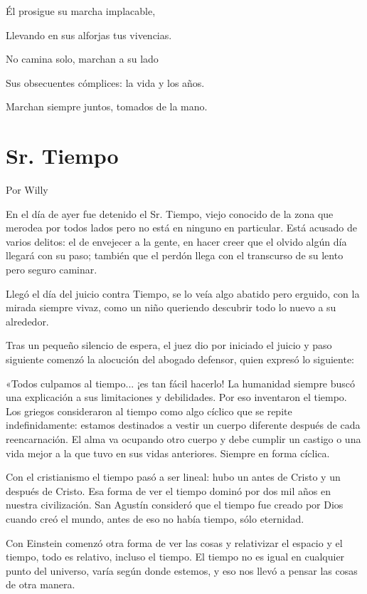 \documentclass[11pt,twoside,openright,a5paper]{book}
\begin{document}
Él prosigue su marcha implacable,

Llevando en sus alforjas tus vivencias.

No camina solo, marchan a su lado

Sus obsecuentes cómplices: la vida y los años.

Marchan siempre juntos, tomados de la mano.

\section*{Sr. Tiempo}

                                                                                           \begin{flushright}Por Willy\end{flushright}

En el día de ayer fue detenido el Sr. Tiempo, viejo conocido de la zona que merodea por todos lados pero no está en ninguno en particular. Está acusado de varios delitos: el de envejecer a la gente, en hacer creer que el olvido algún día llegará con su paso; también que el perdón llega con el transcurso de su lento pero seguro caminar.

Llegó el día del juicio contra Tiempo, se lo veía algo abatido pero erguido, con la mirada siempre vivaz, como un niño queriendo descubrir todo lo nuevo a su alrededor. 

Tras un pequeño silencio de espera, el juez dio por iniciado el juicio y paso siguiente comenzó la alocución del abogado defensor, quien expresó lo siguiente: 

«Todos culpamos al tiempo... ¡es tan fácil hacerlo! La humanidad siempre buscó una explicación a sus limitaciones y debilidades. Por eso inventaron el tiempo. Los griegos consideraron al tiempo como algo cíclico que se repite indefinidamente: estamos destinados a vestir un cuerpo diferente después de cada reencarnación. El alma va ocupando otro cuerpo y debe cumplir un castigo o una vida mejor a la que tuvo en sus vidas anteriores. Siempre en forma cíclica.

Con el cristianismo el tiempo pasó a ser lineal: hubo un antes de Cristo y un después de Cristo. Esa forma de ver el tiempo dominó por dos mil años en nuestra civilización. San Agustín consideró que el tiempo fue creado por Dios cuando creó el mundo, antes de eso no había tiempo, sólo eternidad.

Con Einstein comenzó otra forma de ver las cosas y relativizar el espacio y el tiempo, todo es relativo, incluso el tiempo. El tiempo no es igual en cualquier punto del universo, varía según donde estemos, y eso nos llevó a pensar las cosas de otra manera. 
\end{document}
